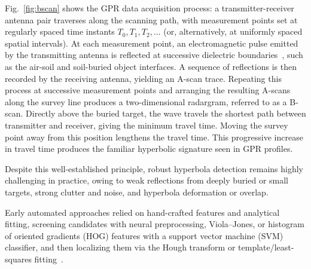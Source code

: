 \documentclass[lettersize,journal]{IEEEtran}
\begin{document}
Fig.~\ref{fig:bscan} shows the GPR data acquisition process: a
transmitter-receiver antenna pair traverses along the scanning path, with
measurement points set at regularly spaced time instants $T_0, T_1, T_2, \dots$
(or, alternatively, at uniformly spaced spatial intervals). At each measurement
point,  an electromagnetic pulse emitted by the transmitting antenna is
reflected at successive dielectric boundaries~\cite{Solimene10}, such as the
air-soil and soil-buried object interfaces. A sequence of reflections is then
recorded by the receiving antenna, yielding an A-scan trace. Repeating this
process at successive measurement points and arranging the resulting A-scans
along the survey line produces a two-dimensional radargram, referred to as a
B-scan. Directly above the buried target, the wave travels the shortest path
between transmitter and receiver, giving the minimum travel time. Moving the
survey point away from this position lengthens the travel time. This progressive
increase in travel time produces the familiar hyperbolic signature seen in GPR
profiles. 

Despite this well-established principle, robust hyperbola detection remains
highly challenging in practice, owing to weak reflections from deeply buried or
small targets, strong clutter and noise, and hyperbola deformation or overlap.


Early automated approaches relied on hand-crafted features and analytical
fitting, screening candidates with neural preprocessing, Viola--Jones, or
histogram of oriented gradients (HOG) features with a support vector machine
(SVM) classifier, and then localizing them via the Hough transform or
template/least-squares
fitting~\cite{alnuaimy2000nn,Maas2013Using,lee2014hog,Sagnard2016Template-matching}.
\end{document}
